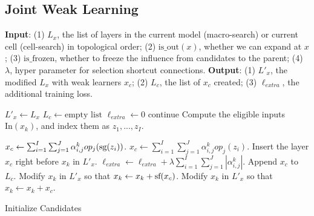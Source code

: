 \subsection{Joint Weak Learning}
\label{sec:candidate_init_and_select}

\begin{algorithm}[t]
\begin{algorithmic}[1]
\STATE \textbf{Input}: 
(1) $L_x$, the list of layers in the current model (macro-search) or current cell (cell-search) in topological order;
(2) $\text{is\_out}(x)$, whether we can expand at $x$;
(3) $\text{is\_frozen}$, whether to freeze the influence from candidates to the parent;
(4) $\lambda$, hyper parameter for selection shortcut connections. 
\STATE \textbf{Output}: (1) $L'_x$, the modified $L_x$ with weak learners $x_c$; 
(2) $L_c$, the list of $x_c$ created;
(3) $\ell_{extra}$, the additional training loss.

\STATE $L'_x \leftarrow L_x$
\STATE $L_c \leftarrow \text{empty list}$
\STATE $\ell_{extra} \leftarrow 0$ 
        \STATE continue
    \ENDIF
    \STATE Compute the eligible inputs $\text{In}(x_{k})$, and index them as $z_1,...,z_I$.

        \STATE $x_c \leftarrow \sum _{i=1}^I \sum _{j=1}^J  \alpha^k_{i,j}op_j(\textrm{sg} (z_i))$.
        \label{algline:add_sg}
    \ELSE
        \STATE $x_c \leftarrow \sum _{i=1}^I \sum _{j=1}^J  \alpha^k_{i,j}op_j(z_i)$.
    \ENDIF
\STATE Insert the layer $x_c$ right before $x_{k}$ in $L'_x$.
\STATE $\ell_{extra} \leftarrow \ell_{extra} + \lambda \sum _{i=1}^I \sum _{j=1}^J |\alpha^k_{i,j}|$.
\STATE Append $x_c$ to $L_c$.
    \STATE Modify $x_{k}$ in $L'_x$ so that $x_{k} \leftarrow x_{k} + \textrm{sf} (x_c)$.
    \label{algline:add_sf}
\ELSE
    \STATE Modify $x_{k}$ in $L'_x$ so that $x_{k} \leftarrow x_{k} + x_c$.
\ENDIF
\ENDFOR
\end{algorithmic}
\caption{Initialize Candidates}
\label{alg:candidate_init}
\end{algorithm}

